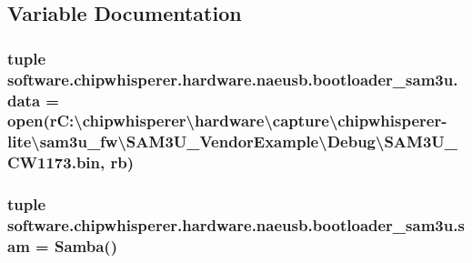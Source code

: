 \subsection{Variable Documentation}
\hypertarget{namespacesoftware_1_1chipwhisperer_1_1hardware_1_1naeusb_1_1bootloader__sam3u_a5c756345d0ae8d1101a105f598850a1b}{}
\subsubsection[{data}]{\setlength{\rightskip}{0pt plus 5cm}tuple software.\+chipwhisperer.\+hardware.\+naeusb.\+bootloader\+\_\+sam3u.\+data = open(r\textquotesingle{}C\+:\textbackslash{}chipwhisperer\textbackslash{}hardware\textbackslash{}capture\textbackslash{}chipwhisperer-\/lite\textbackslash{}sam3u\+\_\+fw\textbackslash{}\+S\+A\+M3\+U\+\_\+\+Vendor\+Example\textbackslash{}\+Debug\textbackslash{}\+S\+A\+M3\+U\+\_\+\+C\+W1173.\+bin\textquotesingle{}, \textquotesingle{}rb\textquotesingle{})}\label{namespacesoftware_1_1chipwhisperer_1_1hardware_1_1naeusb_1_1bootloader__sam3u_a5c756345d0ae8d1101a105f598850a1b}
\hypertarget{namespacesoftware_1_1chipwhisperer_1_1hardware_1_1naeusb_1_1bootloader__sam3u_a74424e87ad4739643b778f0a94ef423f}{}
\subsubsection[{sam}]{\setlength{\rightskip}{0pt plus 5cm}tuple software.\+chipwhisperer.\+hardware.\+naeusb.\+bootloader\+\_\+sam3u.\+sam = {\bf Samba}()}\label{namespacesoftware_1_1chipwhisperer_1_1hardware_1_1naeusb_1_1bootloader__sam3u_a74424e87ad4739643b778f0a94ef423f}

